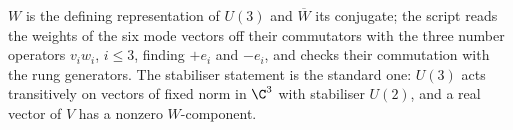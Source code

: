 $W$ is the defining representation of $U(3)$ and $\overline{W}$ its conjugate; the script reads the weights of the six mode vectors off their commutators with the three number operators $v_{i}w_{i}$, $i \le 3$, finding $+e_{i}$ and $-e_{i}$, and checks their commutation with the rung generators. The stabiliser statement is the standard one: $U(3)$ acts transitively on vectors of fixed norm in $\C^{3}$ with stabiliser $U(2)$, and a real vector of $V$ has a nonzero $W$-component.
